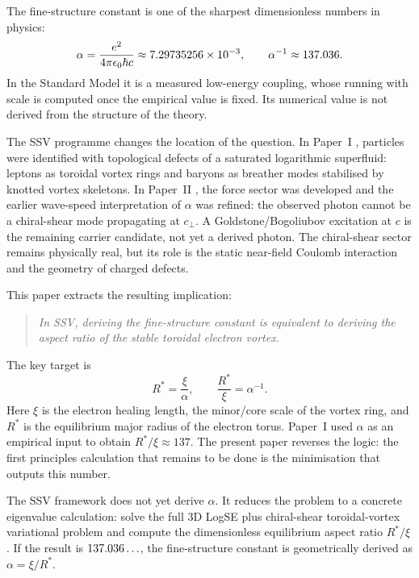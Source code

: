 \documentclass[11pt,a4paper]{article}
\begin{document}
The fine-structure constant is one of the sharpest dimensionless numbers
in physics:
\begin{equation}
    \alpha = \frac{e^2}{4\pi\epsilon_0\hbar c}
    \approx 7.29735256\times 10^{-3},
    \qquad
    \alpha^{-1}\approx 137.036 .
    \label{eq:alpha_qed}
\end{equation}
In the Standard Model it is a measured low-energy coupling, whose running
with scale is computed once the empirical value is fixed.  Its numerical
value is not derived from the structure of the theory.

The SSV programme changes the location of the question.  In Paper~I
\cite{SSV-I}, particles were identified with topological defects of a
saturated logarithmic superfluid: leptons as toroidal vortex rings and
baryons as breather modes stabilised by knotted vortex skeletons.  In
Paper~II \cite{SSV-II}, the force sector was developed and the earlier
wave-speed interpretation of $\alpha$ was refined: the observed photon
cannot be a chiral-shear mode propagating at $c_\perp$.  A
Goldstone/Bogoliubov excitation at $c$ is the remaining carrier candidate,
not yet a derived photon.  The
chiral-shear sector remains physically real, but its role is the static
near-field Coulomb interaction and the geometry of charged defects.

This paper extracts the resulting implication:
\begin{quote}
\emph{In SSV, deriving the fine-structure constant is equivalent to
deriving the aspect ratio of the stable toroidal electron vortex.}
\end{quote}

The key target is
\begin{equation}
    R^* = \frac{\xi}{\alpha},
    \qquad
    \frac{R^*}{\xi} = \alpha^{-1}.
    \label{eq:target_ratio}
\end{equation}
Here $\xi$ is the electron healing length, the minor/core scale of the
vortex ring, and $R^*$ is the equilibrium major radius of the electron
torus.  Paper~I used $\alpha$ as an empirical input to obtain
$R^*/\xi\approx137$.  The present paper reverses the logic: the first
principles calculation that remains to be done is the minimisation that
outputs this number.

\begin{resultbox}
The SSV framework does not yet derive $\alpha$.  It reduces the problem to
a concrete eigenvalue calculation: solve the full 3D LogSE plus
chiral-shear toroidal-vortex variational problem and compute the
dimensionless equilibrium aspect ratio $R^*/\xi$.  If the result is
$137.036\ldots$, the fine-structure constant is geometrically derived as
$\alpha=\xi/R^*$.
\end{resultbox}
\end{document}
